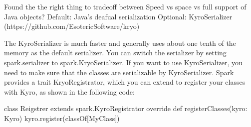 Found the the right thing to tradeoff between Speed vs space vs full support of Java objects?
Default: Java's deafual serialization
Optional: KyroSerializer (https://github.com/EsotericSoftware/kryo)

The KyroSerializer is much faster and generally uses about one tenth of the memory as the default serializer. You can
switch the serializer by setting spark.serializer to spark.KryoSerializer. If you want to use KyroSerializer, you need
to make sure that the classes are serializable by KyroSerializer. Spark provides a trait KryoRegistrator, which you can
extend to register your classes with Kyro, as shown in the following code:

class Reigstrer extends spark.KyroRegistrator {
  override def registerClasses(kyro: Kyro) {
  kyro.register(classOf[MyClass])
  }
}